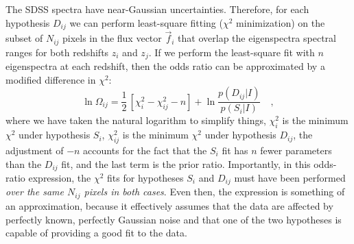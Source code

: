 \documentclass[12pt]{article}
\newcommand{\fluxvec}{\vec{f}}
\begin{document}
The SDSS spectra have near-Gaussian uncertainties.
Therefore, for each hypothesis $D_{ij}$ we can perform least-square
fitting ($\chi^2$ minimization) on the subset of $N_{ij}$ pixels in
the flux vector $\fluxvec_i$ that overlap the eigenspectra spectral
ranges for both redshifts $z_i$ and $z_j$.  If we perform the
least-square fit with $n$ eigenspectra at each redshift, then the odds
ratio can be approximated by a modified difference in $\chi^2$:
\begin{equation}
\ln\Omega_{ij}= \frac{1}{2}\,\left[\chi^2_i-\chi^2_{ij}-n\right]
 +\ln\frac{p(D_{ij}|I)}{p(S_i|I)} \quad,
\end{equation}
where we have taken the natural logarithm to simplify things,
$\chi^2_i$ is the minimum $\chi^2$ under hypothesis $S_i$,
$\chi^2_{ij}$ is the minimum $\chi^2$ under hypothesis $D_{ij}$, the
adjustment of $-n$ accounts for the fact that the $S_i$ fit has $n$
fewer parameters than the $D_{ij}$ fit, and the last term is the prior
ratio.  Importantly, in this odds-ratio expression, the $\chi^2$ fits
for hypotheses $S_i$ and $D_{ij}$ must have been performed \emph{over
the same $N_{ij}$ pixels in both cases}.  Even then, the expression is
something of an approximation, because it effectively assumes that the
data are affected by perfectly known, perfectly Gaussian noise and
that one of the two hypotheses is capable of providing a good fit to
the data.
\end{document}
